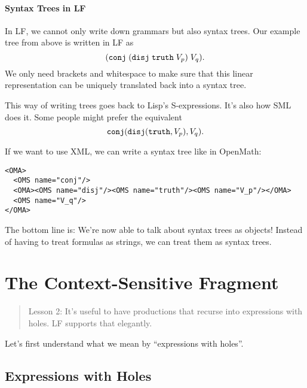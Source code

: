 \paragraph{Syntax Trees in LF}
In LF, we cannot only write down grammars but also syntax trees.
Our example tree from above is written in LF as
 \[(\mathtt{conj}\;(\mathtt{disj}\;\mathtt{truth}\; V_p)\;V_q).\]
We only need brackets and whitespace to make sure that this linear representation can be uniquely translated back into a syntax tree.

This way of writing trees goes back to Lisp's S-expressions. It's also how SML does it. Some people might prefer the equivalent
\[\mathtt{conj}(\mathtt{disj}(\mathtt{truth},V_p),V_q).\]

If we want to use XML, we can write a syntax tree like in OpenMath:
\begin{lstlisting}
<OMA>
  <OMS name="conj"/>
  <OMA><OMS name="disj"/><OMS name="truth"/><OMS name="V_p"/></OMA>
  <OMS name="V_q"/>
</OMA>
\end{lstlisting}

The bottom line is: We're now able to talk about syntax trees as objects! Instead of having to treat formulas as strings, we can treat them as syntax trees.

\section{The Context-Sensitive Fragment}\label{sec:lffe:cs}

\begin{quote}
 Lesson 2: It's useful to have productions that recurse into expressions with holes. LF supports that elegantly.
\end{quote}

Let's first understand what we mean by ``expressions with holes''.

\subsection{Expressions with Holes}\label{sec:lffe:holes}

